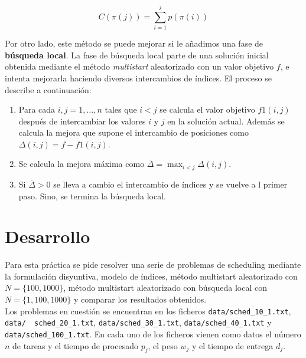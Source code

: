 \documentclass[a4paper,11pt]{article}
\begin{document}
\begin{equation}
	\label{eq:multistart_t_terminacion}
    C(\pi(j)) = \sum_{i=1}^{j}{p(\pi(i))}
\end{equation}

Por otro lado, este método se puede mejorar si le añadimos una fase de \textbf{búsqueda local}. La fase de búsqueda local parte de una solución inicial obtenida mediante el método \textit{multistart} aleatorizado con un valor objetivo ${f}$, e intenta mejorarla haciendo diversos intercambios de índices. El proceso se describe a continuación:

\begin{enumerate}
	\item Para cada ${i,j = 1, \ldots, n}$ tales que ${i<j}$ se calcula el valor objetivo ${f1(i,j)}$ después de intercambiar los valores ${i}$ y ${j}$ en la solución actual. Además se calcula la mejora que supone el intercambio de posiciones como ${\Delta(i,j) = f - f1(i,j)}$.
    \item Se calcula la mejora máxima como ${\overline{\Delta} = \max_{i<j}{\Delta(i,j)}}$.
    \item Si ${\overline{\Delta} > 0}$ se lleva a cambio el intercambio de índices y se vuelve a l primer paso. Sino, se termina la búsqueda local.
\end{enumerate}

\section{Desarrollo}
Para esta práctica se pide resolver una serie de problemas de scheduling mediante la formulación disyuntiva, modelo de índices, método multistart aleatorizado con ${N=\{100, 1000\}}$, método multistart aleatorizado con búsqueda local con ${N=\{1,100,1000\}}$ y comparar los resultados obtenidos.\\

Los problemas en cuestión se encuentran en los ficheros \texttt{data/sched\_10\_1.txt}, \texttt{data/ \ sched\_20\_1.txt}, \texttt{data/sched\_30\_1.txt}, \texttt{data/sched\_40\_1.txt} y \texttt{data/sched\_100\_1.txt}. En cada uno de los ficheros vienen como datos el número ${n}$ de tareas y el tiempo de procesado ${p_{j}}$, el peso ${w_{j}}$ y el tiempo de entrega ${d_{j}}$.\\
\end{document}
